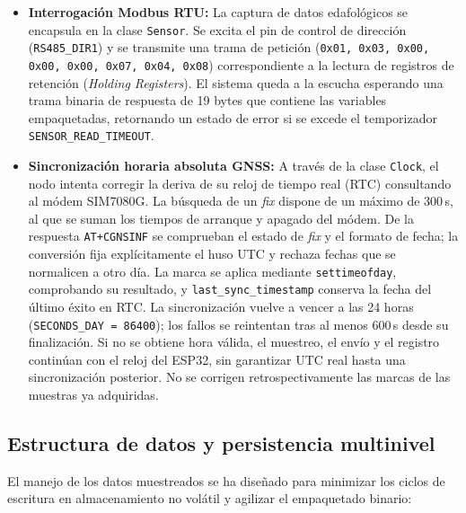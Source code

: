 \begin{itemize}
    \item \textbf{Interrogación Modbus RTU:} La captura de datos edafológicos se encapsula en la clase \texttt{Sensor}. Se excita el pin de control de dirección (\texttt{RS485\_DIR1}) y se transmite una trama de petición (\texttt{0x01, 0x03, 0x00, 0x00, 0x00, 0x07, 0x04, 0x08}) correspondiente a la lectura de registros de retención (\textit{Holding Registers}). El sistema queda a la escucha esperando una trama binaria de respuesta de 19 bytes que contiene las variables empaquetadas, retornando un estado de error si se excede el temporizador \texttt{SENSOR\_READ\_TIMEOUT}.
    \item \textbf{Sincronización horaria absoluta GNSS:} A través de la clase \texttt{Clock}, el nodo intenta corregir la deriva de su reloj de tiempo real (RTC) consultando al módem SIM7080G. La búsqueda de un \textit{fix} dispone de un máximo de 300\,s, al que se suman los tiempos de arranque y apagado del módem. De la respuesta \texttt{AT+CGNSINF} se comprueban el estado de \textit{fix} y el formato de fecha; la conversión fija explícitamente el huso UTC y rechaza fechas que se normalicen a otro día. La marca se aplica mediante \texttt{settimeofday}, comprobando su resultado, y \texttt{last\_sync\_timestamp} conserva la fecha del último éxito en RTC. La sincronización vuelve a vencer a las 24 horas (\texttt{SECONDS\_DAY = 86400}); los fallos se reintentan tras al menos 600\,s desde su finalización. Si no se obtiene hora válida, el muestreo, el envío y el registro continúan con el reloj del ESP32, sin garantizar UTC real hasta una sincronización posterior. No se corrigen retrospectivamente las marcas de las muestras ya adquiridas.
\end{itemize}

\subsection{Estructura de datos y persistencia multinivel}
El manejo de los datos muestreados se ha diseñado para minimizar los ciclos de escritura en almacenamiento no volátil y agilizar el empaquetado binario:

